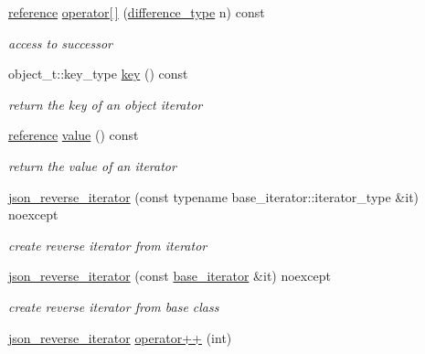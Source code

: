 \begin{DoxyCompactItemize}
\hyperlink{classnlohmann_1_1basic__json_1_1json__reverse__iterator_a7265535f39299824f9712a2ca15013c3}{reference} \hyperlink{classnlohmann_1_1basic__json_1_1json__reverse__iterator_ad4ec2bbb8347e7aa3b58e616fd6c7f40}{operator\mbox{[}$\,$\mbox{]}} (\hyperlink{classnlohmann_1_1basic__json_aec316934a555dd1acdd3600e5d4a4cdf}{difference\-\_\-type} n) const 
\begin{DoxyCompactList}\small\item\em access to successor \end{DoxyCompactList}\item 
object\-\_\-t\-::key\-\_\-type \hyperlink{classnlohmann_1_1basic__json_1_1json__reverse__iterator_acecae6d237fcf14c909fb42b9d2e2955}{key} () const 
\begin{DoxyCompactList}\small\item\em return the key of an object iterator \end{DoxyCompactList}\item 
\hyperlink{classnlohmann_1_1basic__json_1_1json__reverse__iterator_a7265535f39299824f9712a2ca15013c3}{reference} \hyperlink{classnlohmann_1_1basic__json_1_1json__reverse__iterator_aca5116682e206dac48f8a56716a3280b}{value} () const 
\begin{DoxyCompactList}\small\item\em return the value of an iterator \end{DoxyCompactList}\item 
\hyperlink{classnlohmann_1_1basic__json_1_1json__reverse__iterator_a86c97bbb8ebe19aef4656cf796e30e99}{json\-\_\-reverse\-\_\-iterator} (const typename base\-\_\-iterator\-::iterator\-\_\-type \&it) noexcept
\begin{DoxyCompactList}\small\item\em create reverse iterator from iterator \end{DoxyCompactList}\item 
\hyperlink{classnlohmann_1_1basic__json_1_1json__reverse__iterator_a530f042e2ab1c83dddfc344931b0375a}{json\-\_\-reverse\-\_\-iterator} (const \hyperlink{classnlohmann_1_1basic__json_1_1json__reverse__iterator_a9ebc4c99e6fc90c965af0f39ad2ca70e}{base\-\_\-iterator} \&it) noexcept
\begin{DoxyCompactList}\small\item\em create reverse iterator from base class \end{DoxyCompactList}\item 
\hyperlink{classnlohmann_1_1basic__json_1_1json__reverse__iterator}{json\-\_\-reverse\-\_\-iterator} \hyperlink{classnlohmann_1_1basic__json_1_1json__reverse__iterator_a545a8204cfd6836eb85abc3113a0bb28}{operator++} (int)

\end{DoxyCompactItemize}
